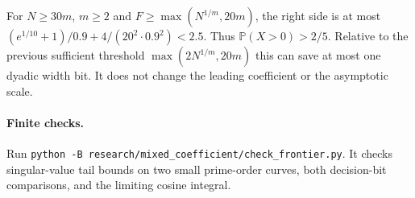 \documentclass[11pt]{article}
\newcommand{\Prob}{\mathbb P}
\begin{document}
For $N\ge30m$, $m\ge2$ and $F\ge\max(N^{1/m},20m)$, the right side
is at most $(e^{1/10}+1)/0.9+4/(20^2\cdot0.9^2)<2.5$.
Thus $\Prob(X>0)>2/5$. Relative to the previous sufficient threshold
$\max(2N^{1/m},20m)$ this can save at most one dyadic width bit.
It does not change the leading coefficient or the asymptotic scale.

\paragraph{Finite checks.}
Run \texttt{python -B research/mixed\_coefficient/check\_frontier.py}.
It checks singular-value tail bounds on two small prime-order curves,
both decision-bit comparisons, and the limiting cosine integral.
\end{document}
